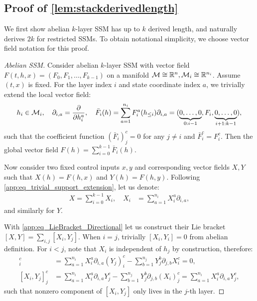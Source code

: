 \subsection{Proof of \cref{lem:stackderivedlength}}
\label{app:stackderivedlength_proof}
We first show abelian $k$-layer SSM has up to $k$ derived length,
and naturally derives $2k$ for restricted SSMs.
To obtain notational simplicity, we choose vector field notation for this proof.
\begin{proof}[Abelian SSM]
    Consider abelian $k$-layer SSM with vector field
    $F(t,h,x) = (F_0, F_1, \ldots, F_{k-1})$ on a manifold $\mathcal{M} \cong \mathbb{R}^n, \mathcal{M}_i \cong \mathbb{R}^{n_i}$.
    Assume $(t,x)$ is fixed.
    For the layer index $i$ and state coordinate index $a$, we trivially extend the local vector field:
    \begin{equation}
    \label{app:eq_trivial_support_extension}
        h_i \in \mathcal{M}_i,
        \quad
        \partial_{i,a} = \frac{\partial}{\partial h_i^a},
        \quad 
        \bar{F}_i(h) = \sum_{a=1}^{n_i} F_i^a (h_{\le i}) \partial_{i,a}
        = (\underbrace{0,\ldots,0}_{0:i-1}, F_i, \underbrace{0,\ldots,0}_{i+1:k-1}),
    \end{equation}
    such that the coefficient function $(\bar{F}_i)_j^c = 0$ for any $j \neq i$ and $\bar{F}_i^c = F_i^c$.
    Then the global vector field $F(h) = \sum_{i=0}^{k-1} \bar{F}_i(h)$.
    
    Now consider two fixed control inputs $x,y$ and corresponding vector fields $X,Y$
    such that $X(h) = F(h,x)$ and $Y(h) = F(h,y)$.
    Following \cref{app:eq_trivial_support_extension}, let us denote:
    \begin{align*}
        X = \sum_{i=0}^{k-1} X_i,
        \quad
        X_i &= \sum_{a=1}^{n_i}X_i^a \partial_{i,a},
    \end{align*}
    and similarly for $Y$.

    With \cref{app:eq_LieBracket_Directional} let us construct their Lie bracket $[X,Y] = \sum_{i,j}[X_i,Y_j]$.
    When $i=j$, trivially $[X_i,Y_i] = 0$ from abelian definition.
    For $i < j$, note that $X_i$ is independent of $h_j$ by construction, therefore:
    \begin{align}
        [X_i,Y_j]_i^c &= \sum_{a=1}^{n_i}X_i^a \partial_{i,a} (Y_j)_i^c
        - \sum_{b=1}^{n_j}Y_j^b \partial_{j,b} X_i^c = 0, \label{eq:zerocrossbracket} \\
        [X_i,Y_j]_j^c &= \sum_{a=1}^{n_i}X_i^a \partial_{i,a} Y_j^c
        - \sum_{b=1}^{n_j}Y_j^b \partial_{j,b} (X_i)_j^c
        = \sum_{a=1}^{n_i}X_i^a \partial_{i,a} Y_j^c, \label{eq:nonzerocrossbracket}
    \end{align}
    such that nonzero component of $[X_i,Y_j]$ only lives in the $j$-th layer.


\end{proof}
